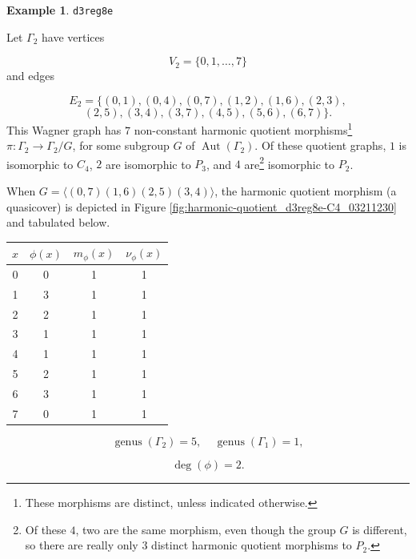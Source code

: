 \documentclass[12pt,letterpaper]{article}
\theoremstyle{definition}
\newtheorem{example}[theorem]{Example}
\DeclareMathOperator{\Aut}{Aut}
\DeclareMathOperator{\genus}{genus}
\begin{document}
\begin{example}%
\label{example:d3reg8e}
    {\tt d3reg8e}\newline
{\rm  
Let $\Gamma_2$ have vertices

\[
V_2=\{0,1,\dots,7\}
\]
and edges

\[
E_2 = \{(0, 1), (0, 4), (0, 7), (1, 2), (1, 6), (2, 3),
\]
\[
(2, 5), (3, 4), (3, 7), (4, 5), (5, 6), (6, 7)
\}.
\]
This Wagner graph has $7$ non-constant harmonic quotient
morphisms\footnote{These morphisms are distinct, unless indicated otherwise.}
$\pi: \Gamma_2\to \Gamma_2/G$, for some subgroup
$G$ of $\Aut(\Gamma_2)$. Of these quotient graphs,
$1$ is isomorphic to $C_4$, $2$ are isomorphic to $P_3$, and
$4$ are\footnote{Of these $4$, two are the same
morphism, even though the group $G$ is different, so there are
really only $3$ distinct harmonic quotient morphisms to $P_2$.}
isomorphic to $P_2$.

When $G=\langle (0,7)(1,6)(2,5)(3,4) \rangle$,
the harmonic quotient morphism (a quasicover) is depicted in
Figure \ref{fig:harmonic-quotient_d3reg8e-C4_03211230} and
tabulated below.

\begin{center}
\begin{tabular}{c|c|c|c}  
  $x$ & $\phi(x)$ & $m_\phi(x)$ & $\nu_\phi(x)$ \\ \hline
  0   &    0   &        1         &  1   \\
  1   &    3   &        1         &  1   \\
  2   &    2   &        1         &  1   \\
  3   &    1   &        1         &  1   \\
  4   &    1   &        1         &  1   \\
  5   &    2   &        1         &  1   \\
  6   &    3   &        1         &  1   \\
  7   &    0   &        1         &  1   \\
\end{tabular}
\end{center}

\[
  \genus(\Gamma_2) =5,\ \ \ \ \
  \genus(\Gamma_1) =1,
\]

\[
\deg(\phi) =2.
\]


}
\end{example}
\end{document}
